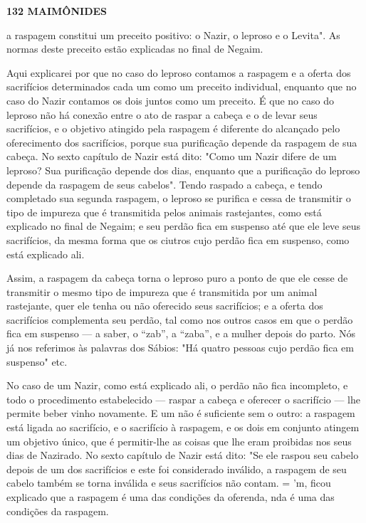 \textbf{132 MAIMÔNIDES}

a raspagem constitui um preceito positivo: o Nazir, o leproso e o
Levita". As normas deste preceito estão explicadas no final de Negaim.

Aqui explicarei por que no caso do leproso contamos a raspagem e a
oferta dos sacrifícios determinados cada um como um preceito individual,
enquanto que no caso do Nazir contamos os dois juntos como um preceito.
É que no caso do leproso não há conexão entre o ato de raspar a cabeça e
o de levar seus sacrifícios, e o objetivo atingido pela raspagem é
diferente do al­cançado pelo oferecimento dos sacrifícios, porque sua
purificação depende da raspagem de sua cabeça. No sexto capítulo de
Nazir está dito: "Como um Nazir difere de um leproso? Sua purificação
depende dos dias, enquanto que a purifi­cação do leproso depende da
raspagem de seus cabelos". Tendo raspado a ca­beça, e tendo completado
sua segunda raspagem, o leproso se purifica e cessa de transmitir o tipo
de impureza que é transmitida pelos animais rastejantes, como está
explicado no final de Negaim; e seu perdão fica em suspenso até que ele
leve seus sacrifícios, da mesma forma que os ciutros cujo perdão fica em
suspenso, como está explicado ali.

Assim, a raspagem da cabeça torna o leproso puro a ponto de que ele
cesse de transmitir o mesmo tipo de impureza que é transmitida por um
animal rastejante, quer ele tenha ou não oferecido seus sacrifícios; e a
oferta dos sacrifícios complementa seu perdão, tal como nos outros casos
em que o perdão fica em suspenso --- a saber, o ``zab'', a ``zaba'', e a
mulher depois do parto. Nós já nos referimos às palavras dos Sábios: "Há
quatro pessoas cujo per­dão fica em suspenso" etc.

No caso de um Nazir, como está explicado ali, o perdão não fica
in­completo, e todo o procedimento estabelecido --- raspar a cabeça e
oferecer o sacrifício --- lhe permite beber vinho novamente. E um não é
suficiente sem o outro: a raspagem está ligada ao sacrifício, e o
sacrifício à raspagem, e os dois em conjunto atingem um objetivo único,
que é permitir-lhe as coisas que lhe eram proibidas nos seus dias de
Nazirado. No sexto capítulo de Nazir está dito: "Se ele raspou seu
cabelo depois de um dos sacrifícios e este foi considerado inválido, a
raspagem de seu cabelo também se torna inválida e seus sacrifícios não
contam. = 'm, ficou explicado que a raspagem é uma das condições da
oferenda, nda é uma das condições da raspagem.


